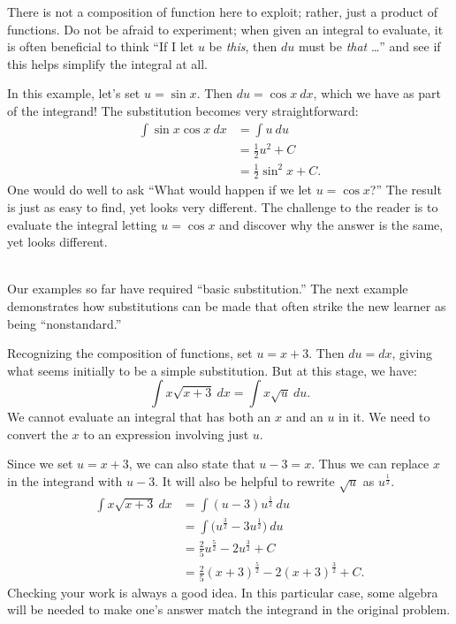 {There is not a composition of function here to exploit; rather, just a product of functions. Do not be afraid to experiment; when given an integral to evaluate, it is often beneficial to think ``If I let $u$ be \textit{this}, then $du$ must be \textit{that} \ldots'' and see if this helps simplify the integral at all.

In this example, let's set $u = \sin x$. Then $du = \cos x\ dx$, which we have as part of the integrand! The substitution becomes very straightforward:
		\begin{align*}
		\int \sin x\cos x\ dx &=	\int u\ du \\
											&= \frac12u^2+ C \\
											&= \frac12\sin^2 x + C.
		\end{align*}
One would do well to ask ``What would happen if we let $u = \cos x$?'' The result is just as easy to find, yet looks very different. The challenge to the reader is to evaluate the integral letting $u = \cos x$ and discover why the answer is the same, yet looks different.
}\\

Our examples so far have required ``basic substitution.'' The next example demonstrates how substitutions can be made that often strike the new learner as being ``nonstandard.''\\


{Recognizing the composition of functions, set $u = x+3$. Then $du = dx$, giving what seems initially to be a simple substitution. But at this stage, we have:
	$$\int x\sqrt{x+3}\ dx = \int x\sqrt{u}\ du.$$
We cannot evaluate an integral that has both an $x$ and an $u$ in it. We need to convert the $x$ to an expression involving just $u$.

Since we set $u = x+3$, we can also state that $u-3 = x$. Thus we can replace $x$ in the integrand with $u-3$. It will also be helpful to rewrite $\sqrt{u}$ as $u^\frac12$.
\begin{align*}
		\int x\sqrt{x+3} \ dx &= \int (u-3)u^\frac12\ du \\
											&= \int \big(u^\frac32 - 3u^\frac12\big) \ du \\
											&= \frac25u^\frac52 - 2u^\frac32 + C \\
											&= \frac25(x+3)^\frac52 - 2(x+3)^\frac32 + C.
\end{align*}
Checking your work is always a good idea. In this particular case, some algebra will be needed to make one's answer match the integrand in the original problem.
}\\

